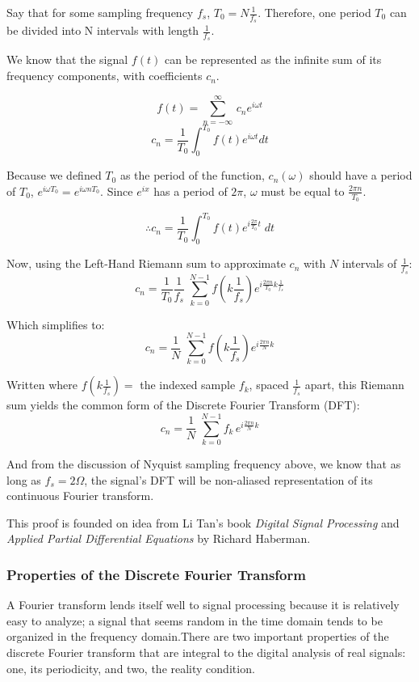 \documentclass[12pt]{article}
\begin{document}
Say that for some sampling frequency \(f_s\), \(T_0 = N\frac{1}{f_{s}} \). Therefore, one period \( T_0\) can be divided into N intervals with length \( \frac{1}{f_{s}}\).

We know that the signal \(f(t)\) can be represented as the infinite sum of its frequency components, with coefficients \(c_n\).

\[ f(t) = \sum_{n = -\infty}^{\infty} \,c_n e^{i\omega t} \]
\[ c_{n} = \frac{1}{T_0} \int_{0}^{T_0} f(t) e^{i\omega t} dt\]

Because we defined \(T_0\) as the period of the function, \(c_{n}(\omega) \) should have a period of \( T_0\), \(e^{i\omega T_0} = e^{i\omega nT_0}\). Since \(e^{i x}\) has a period of \( 2\pi \), \( \omega \) must be equal to \(\frac{2\pi n}{T_0} \). 

\[ \therefore c_{n} = \frac{1}{T_0} \int_{0}^{T_0} f(t) e^{i \frac{2\pi}{T_0} t } \; dt\] 

Now, using the Left-Hand Riemann sum to approximate \( c_n\) with \( N\) intervals of \( \frac{1}{f_s} \):
\[ c_{n} = \frac{1}{T_0} \frac{1}{f_s} \; \sum_{k = 0}^{N-1} f(k \frac{1}{f_s}) e^{i \frac{2\pi n}{T_0} k\frac{1}{f_s}} \]

Which simplifies to:
\[ c_{n} = \frac{1}{N} \; \sum_{k = 0}^{N-1} f(k \frac{1}{f_s}) e^{i \frac{2\pi n}{N}k} \]

Written where \( f(k \frac{1}{f_s}) =\) the indexed sample \(f_k\), spaced \(\frac{1}{f_s}\) apart, this Riemann sum yields the common form of the Discrete Fourier Transform (DFT):
\[ c_{n} = \frac{1}{N} \; \sum_{k = 0}^{N-1} f_k \, e^{i \frac{2\pi n}{N}k} \]

And from the discussion of Nyquist sampling frequency above, we know that as long as \(f_s = 2\Omega\), the signal's DFT will be non-aliased representation of its continuous Fourier transform.

This proof is founded on idea from Li Tan's book \emph{Digital Signal Processing} and \emph{Applied Partial Differential Equations} by Richard Haberman.

\subsubsection{Properties of the Discrete Fourier Transform}

A Fourier transform lends itself well to signal processing because it is relatively easy to analyze; a signal that seems random in the time domain tends to be organized in the frequency domain.There are two important properties of the discrete Fourier transform that are integral to the digital analysis of real signals: one, its periodicity, and two, the reality condition.
\end{document}
